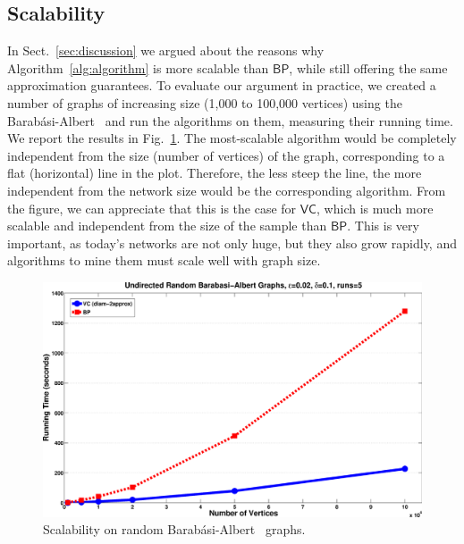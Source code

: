 \subsection{Scalability}\label{sec:scalability}

In Sect.~\ref{sec:discussion} we argued about the reasons why
Algorithm~\ref{alg:algorithm} is more scalable than $\mathsf{BP}$, while still
offering the same approximation guarantees. To evaluate our argument in practice, we
created a number of graphs of increasing size (1,000 to 100,000 vertices) using
the Barab\'asi-Albert~\citep{BarabasiA99} and run the algorithms on them,
measuring their running time. We report the results in Fig.~\ref{fig:random:time}.
The most-scalable algorithm would be completely independent from the size
(number of vertices) of the graph, corresponding to a flat (horizontal) line in
the plot. Therefore, the less steep the line, the more independent from the
network size would be the corresponding algorithm. From the figure, we can
appreciate that this is the case for $\mathsf{VC}$, which is much more scalable
and independent from the size of the sample than $\mathsf{BP}$. This is very
important, as today's networks are not only huge, but they also grow rapidly,
and algorithms to mine them must scale well with graph size.
\begin{figure}[ht]
  \centering
  \includegraphics[width=.45\textwidth,keepaspectratio]{figures/eps/random-time}
  \caption{Scalability on random Barab\'asi-Albert~\citep{BarabasiA99} graphs.}
  \label{fig:random:time}
\end{figure}


